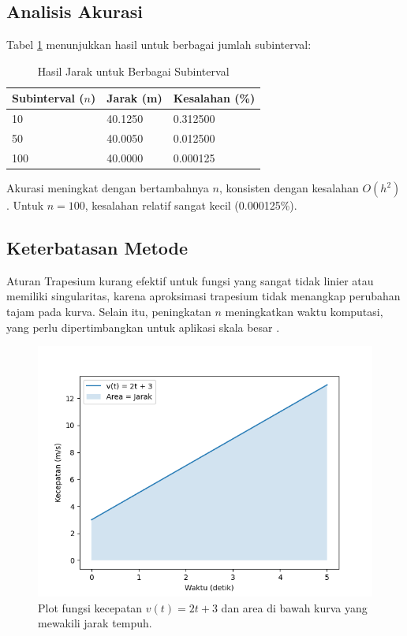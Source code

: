 \documentclass[conference]{IEEEtran}
\begin{document}
\subsection{Analisis Akurasi}
Tabel \ref{tab:results} menunjukkan hasil untuk berbagai jumlah subinterval:
\begin{table}[htbp]
\caption{Hasil Jarak untuk Berbagai Subinterval}
\begin{center}
\small
\begin{tabular}{|p{2.2cm}|p{2.2cm}|p{2.2cm}|}
\hline
\textbf{Subinterval (\( n \))} & \textbf{Jarak (m)} & \textbf{Kesalahan (\%)} \\
\hline
10 & 40.1250 & 0.312500 \\
50 & 40.0050 & 0.012500 \\
100 & 40.0000 & 0.000125 \\
\hline
\end{tabular}
\label{tab:results}
\end{center}
\end{table}
Akurasi meningkat dengan bertambahnya \( n \), konsisten dengan kesalahan \( O(h^2) \). Untuk \( n = 100 \), kesalahan relatif sangat kecil (0.000125\%).

\subsection{Keterbatasan Metode}
Aturan Trapesium kurang efektif untuk fungsi yang sangat tidak linier atau memiliki singularitas, karena aproksimasi trapesium tidak menangkap perubahan tajam pada kurva. Selain itu, peningkatan \( n \) meningkatkan waktu komputasi, yang perlu dipertimbangkan untuk aplikasi skala besar \cite{b1}.

\begin{figure}[htbp]
\centerline{\includegraphics[width=1.01\linewidth]{images/velocity_plot.png}}
\caption{Plot fungsi kecepatan \( v(t) = 2t + 3 \) dan area di bawah kurva yang mewakili jarak tempuh.}
\label{fig:velocity}
\end{figure}
\end{document}
